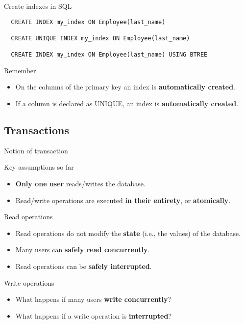 \documentclass[xcolor=table]{beamer}
\begin{document}
  \begin{frame}[fragile]{Create indexes in SQL}
  \begin{block}{}
    \footnotesize
  \begin{verbatim}
  CREATE INDEX my_index ON Employee(last_name)
  
  CREATE UNIQUE INDEX my_index ON Employee(last_name)
  
  CREATE INDEX my_index ON Employee(last_name) USING BTREE
  \end{verbatim} 
  \end{block}
  \vfill
  \begin{exampleblock}{Remember}
    \begin{itemize}
    \item On the columns of the primary key an index is {\bf automatically created}.
    \item If a column is declared as UNIQUE, an index is {\bf automatically created}.
  \end{itemize}
  \end{exampleblock}
  
  \end{frame}

\subsection{Transactions}

\begin{frame}{Notion of transaction}
  \begin{block}{Key assumptions so far}
    \begin{itemize}
      \item {\bf Only one user} reads/writes the database.
      \item Read/write operations are executed {\bf in 
      their entirety}, or {\bf atomically}. 
    \end{itemize}
  \end{block}
  \vfill
  \begin{exampleblock}{Read operations}
  \begin{itemize}
    \item Read operations do not modify the {\bf state} (i.e., the values) of the database.
    \item Many users can {\bf safely read concurrently}.
    \item Read operations can be {\bf safely interrupted}.
  \end{itemize}
  \end{exampleblock}
  \vfill
  \begin{block}{Write operations}
    \begin{itemize}
      \item What happens if many users {\bf write concurrently}?
      \item What happens if a write operation is {\bf interrupted}?
    \end{itemize}
  \end{block}
  
  \end{frame}
  
\end{document}
